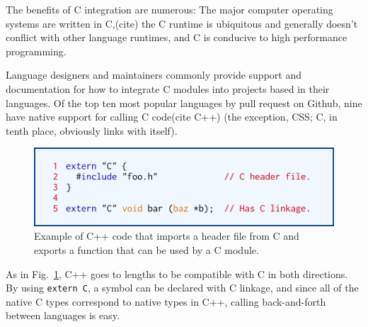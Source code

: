 The benefits of C integration are numerous: The major computer operating systems are written in C,(cite) the C runtime is ubiquitous and generally doesn't conflict with other language runtimes, and C is conducive to high performance programming.

Language designers and maintainers commonly provide support and documentation for how to integrate C modules into projects based in their languages.  Of the top ten most popular languages by pull request on Github\cite{Octoverse}, nine have native support for calling C code\cite{JavascriptCiface}\cite{PythonCiface}\cite{JavaCiface}\cite{RubyCiface}\cite{PHPCiface}\cite{DotNetCiface}\cite{GoCiface}(cite C++) (the exception, CSS; C, in tenth place, obviously links with itself).

\begin{figure}[htbp!]
        \centering
        \includegraphics[scale=0.25]{gfx/extern}
        \caption{Example of C++ code that imports a header file from C and exports a function that can be used by a C module.}
        \label{fig:extern-example}
\end{figure}

As in Fig.~\ref{fig:extern-example}, C++ goes to lengths to be compatible with C in both directions.  By using \texttt{extern \textquotedbl{}C\textquotedbl{}}, a symbol can be declared with C linkage, and since all of the native C types correspond to native types in C++, calling back-and-forth between languages is easy.

